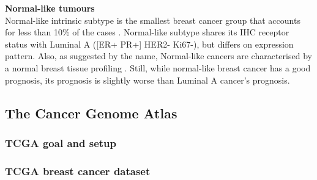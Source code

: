 \textbf{Normal-like tumours }\\
Normal-like intrinsic subtype is the smallest breast cancer group that accounts for less than 10\% of the cases \cite{Dai2015}. Normal-like subtype shares its IHC receptor status with Luminal A ([ER+ PR+] HER2- Ki67-), but differs on expression pattern. Also, as suggested by the name, Normal-like cancers are characterised by a normal breast tissue profiling \cite{perou2000molecular}. Still, while normal-like breast cancer has a good prognosis, its prognosis is slightly worse than Luminal A cancer’s prognosis.\\











































    \newpage    
    \subsection{The Cancer Genome Atlas}
        \subsubsection{TCGA goal and setup}
        \subsubsection{TCGA breast cancer dataset}

